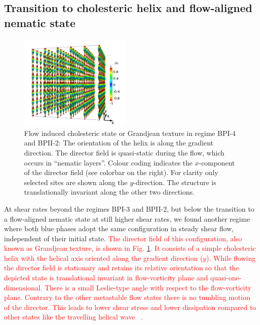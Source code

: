 \documentclass[8.5pt,twoside,twocolumn]{article}
\newcommand{\rev}[1]{{\textcolor{red}{#1}}}
\begin{document}
\subsection{Transition to cholesteric helix and flow-aligned nematic state}\label{gj-fan}

\begin{figure}[htpb]
\includegraphics[width=0.475\textwidth]{dir3d+y-200k_run1179r.png}
\caption{Flow induced cholesteric state or Grandjean texture in regime BPI-4 and BPII-2: 
The orientation of the helix is along the gradient direction. 
The director field is quasi-static during the flow, which occurs 
in ``nematic layers''. Colour coding indicates the 
$x$-component of the director field (see colorbar on the right).
For clarity only selected sites are shown along the $y$-direction.
The structure is translationally invariant along the other two directions.}
\label{grandjean}
\end{figure}

At shear rates beyond the regimes BPI-3 and BPII-2, but below the transition to a 
flow-aligned nematic state at still higher shear rates, we found another regime where 
both blue phases adopt the same configuration in steady shear flow, 
independent of their initial state.
\rev{
The director field of this configuration, also known as
Grandjean texture, is shown in Fig. \ref{grandjean}.
It consists of a simple cholesteric helix with the helical axis oriented 
along the gradient direction ($y$). While flowing the director field is stationary and 
retains its relative orientation so that the depicted state is translational invariant 
in flow-vorticity plane and quasi-one-dimensional. 
There is a small Leslie-type angle with respect to 
the flow-vorticity plane. 
Contrary to the other metastable flow states there is no tumbling motion 
of the director. This leads to lower shear stress and lower dissipation 
compared to other states like the travelling helical wave ~\cite{Rey:1996a, Rey:1996b}.
} 
\end{document}
